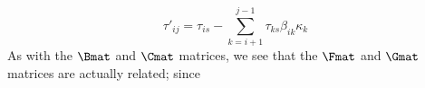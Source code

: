 \begin{equation}
  \tau'_{i j }  = \tau_{i s} - \sum\limits_{k = i + 1}^{j - 1} \tau_{k s} \beta_{i k} \kappa_k
\end{equation}
As with the $\Bmat$ and $\Cmat$ matrices, we see that the $\Fmat$ and $\Gmat$ matrices are actually related; since